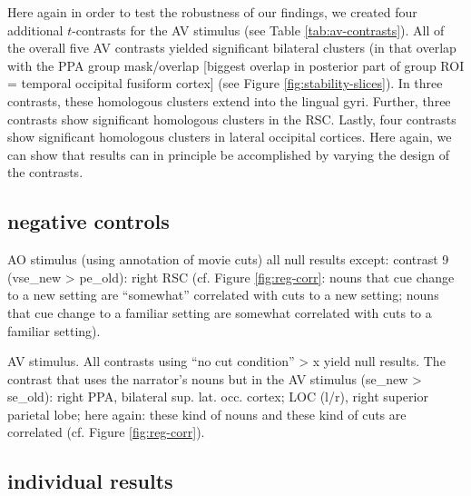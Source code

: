 \documentclass[english]{article}
\begin{document}
Here again in order to test the robustness of our findings, we created four
additional $t$-contrasts for the AV stimulus (see Table \ref{tab:av-contrasts}).
All of the overall five AV contrasts yielded significant bilateral clusters (in
that overlap with the PPA group mask/overlap [biggest overlap in posterior part
of group ROI = temporal occipital fusiform cortex] (see Figure
\ref{fig:stability-slices}).
In three contrasts, these homologous clusters extend into the lingual gyri.
Further, three contrasts show significant homologous clusters in the RSC.
Lastly, four contrasts show significant homologous clusters in lateral occipital
cortices.
Here again, we can show that results can in principle be accomplished by varying
the design of the contrasts.


\subsection{negative controls}


AO stimulus (using annotation of movie cuts) all null results except: contrast 9
(vse\_new > pe\_old): right RSC
(cf. Figure \ref{fig:reg-corr}: nouns that cue change to a new setting are
``somewhat'' correlated with cuts to a new setting; nouns that cue change to a
familiar setting are somewhat correlated with cuts to a familiar setting).

AV stimulus. All contrasts using ``no cut condition'' > x yield null results.
The contrast that uses the narrator's nouns but in the AV stimulus (se\_new >
se\_old): right PPA, bilateral sup. lat. occ. cortex; LOC (l/r), right superior
parietal lobe; here again: these kind of nouns and these kind of cuts are
correlated (cf. Figure \ref{fig:reg-corr}).


\subsection{individual results}

\end{document}
